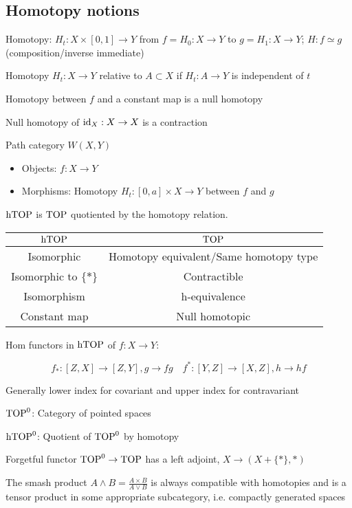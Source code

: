 \subsection{Homotopy notions}

Homotopy: $H_t:X\times[0,1]\to Y$ from $f=H_0:X\to Y$ to $g=H_1:X\to Y$; $H:f\simeq g$ (composition/inverse immediate)

Homotopy $H_t:X\to Y$ relative to $A\subset X$ if $H_t:A\to Y$ is independent of $t$

Homotopy between $f$ and a constant map is a null homotopy

Null homotopy of $\operatorname{id}_X:X\to X$ is a contraction

Path category $W(X,Y)$
\begin{itemize}
    \item Objects: $f:X\to Y$
    \item Morphisms: Homotopy $H_t:[0,a]\times X\to Y$ between $f$ and $g$
\end{itemize}

$\operatorname{hTOP}$ is $\operatorname{TOP}$ quotiented by the homotopy relation.

\begin{tabular}{cc}\hline
    $\operatorname{hTOP}$&$\operatorname{TOP}$\\\hline
    Isomorphic&Homotopy equivalent/Same homotopy type\\\hline
    Isomorphic to $\{*\}$&Contractible\\\hline
    Isomorphism&h-equivalence\\\hline
    Constant map&Null homotopic\\\hline
\end{tabular}

Hom functors in $\operatorname{hTOP}$ of $f:X\to Y$:

\[f_*:[Z,X]\to[Z,Y],g\to fg\quad f^*:[Y,Z]\to [X,Z],h\to hf\]

\begin{rmk}
    Generally lower index for covariant and upper index for contravariant
\end{rmk}

$\operatorname{TOP}^0$: Category of pointed spaces

$\operatorname{hTOP}^0$: Quotient of $\operatorname{TOP}^0$ by homotopy

Forgetful functor $\operatorname{TOP}^0\to\operatorname{TOP}$ has a left adjoint, $X\to\left(X+\{*\},*\right)$

\begin{rmk}
    The smash product $A\wedge B=\frac{A\times B}{A\vee B}$ is always compatible with homotopies and is a tensor product in some appropriate subcategory, i.e. compactly generated spaces
\end{rmk}

